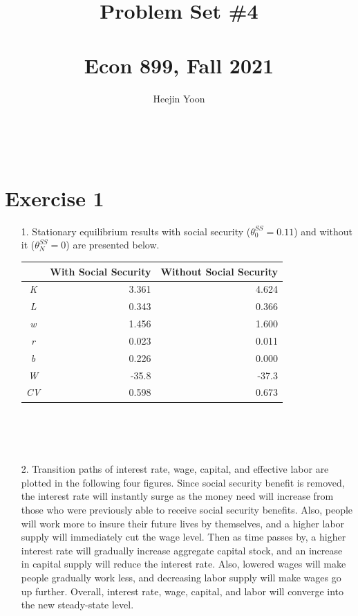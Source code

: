 \documentclass[11pt]{article} %
\title{Problem Set \#4\\ ~\\ \large{Econ 899, Fall 2021} }
\author{Heejin Yoon}
\begin{document}
\maketitle
~\\

\section*{Exercise 1}
\begin{itemize}
	\item[1.] Stationary equilibrium results with social security ($\theta^{SS}_{0}=0.11$) and without it ($\theta^{SS}_{N}=0$) are presented below.
	
	\begin{center}
		\begin{tabular}{c|r|r} 
			\hline
			& \multicolumn{1}{c|}{With Social Security} & \multicolumn{1}{c}{Without Social Security}  \\ 
			\hline
			\textit{K}  & 3.361                                     & 4.624                                        \\
			\textit{L}  & 0.343                                     & 0.366                                        \\
			\textit{w}  & 1.456                                     & 1.600                                        \\
			\textit{r}  & 0.023                                     & 0.011                                        \\
			\textit{b}  & 0.226                                     & 0.000                                        \\
			\textit{W}  & -35.8                                     & -37.3                                        \\
			\textit{CV} & 0.598                                     & 0.673                                        \\
			\hline
		\end{tabular}
	\end{center}
	~\\~\\~
	\item[2.] Transition paths of interest rate, wage, capital, and effective labor are plotted in the following four figures. Since social security benefit is removed, the interest rate will instantly surge as the money need will increase from those who were previously able to receive social security benefits. Also, people will work more to insure their future lives by themselves, and a higher labor supply will immediately cut the wage level. Then as time passes by, a higher interest rate will gradually increase aggregate capital stock, and an increase in capital supply will reduce the interest rate. Also, lowered wages will make people gradually work less, and decreasing labor supply will make wages go up further. Overall, interest rate, wage, capital, and labor will converge into the new steady-state level.
	\pagebreak
	

\end{itemize}
\end{document}
